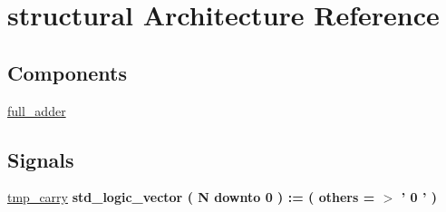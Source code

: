 \hypertarget{classripple__carry__adder_1_1structural}{\section{structural Architecture Reference}
\label{classripple__carry__adder_1_1structural}
}
\subsection*{Components}
 \begin{DoxyCompactItemize}
\item 
\hypertarget{classripple__carry__adder_1_1structural_gafc1dc8c8d5b91fffc35f2b2eede724ce}{\hyperlink{group___majority_voter_gafc1dc8c8d5b91fffc35f2b2eede724ce}{full\+\_\+adder}  {\bfseries }  }\label{classripple__carry__adder_1_1structural_gafc1dc8c8d5b91fffc35f2b2eede724ce}

\end{DoxyCompactItemize}
\subsection*{Signals}
 \begin{DoxyCompactItemize}
\item 
\hypertarget{classripple__carry__adder_1_1structural_ga2943a61ba696a3860c97e0fc3e492416}{\hyperlink{group___majority_voter_ga2943a61ba696a3860c97e0fc3e492416}{tmp\+\_\+carry} {\bfseries \textcolor{vhdlchar}{std\+\_\+logic\+\_\+vector}\textcolor{vhdlchar}{ }\textcolor{vhdlchar}{(}\textcolor{vhdlchar}{ }\textcolor{vhdlchar}{ }\textcolor{vhdlchar}{ }\textcolor{vhdlchar}{ }\textcolor{vhdlchar}{N}\textcolor{vhdlchar}{ }\textcolor{vhdlchar}{downto}\textcolor{vhdlchar}{ }\textcolor{vhdlchar}{ } \textcolor{vhdldigit}{0} \textcolor{vhdlchar}{ }\textcolor{vhdlchar}{)}\textcolor{vhdlchar}{ }\textcolor{vhdlchar}{ }\textcolor{vhdlchar}{ }\textcolor{vhdlchar}{\+:}\textcolor{vhdlchar}{=}\textcolor{vhdlchar}{ }\textcolor{vhdlchar}{(}\textcolor{vhdlchar}{ }\textcolor{vhdlchar}{ }\textcolor{vhdlchar}{others}\textcolor{vhdlchar}{ }\textcolor{vhdlchar}{ }\textcolor{vhdlchar}{=}\textcolor{vhdlchar}{ }\textcolor{vhdlchar}{$>$}\textcolor{vhdlchar}{ }\textcolor{vhdlchar}{'}\textcolor{vhdlchar}{ } \textcolor{vhdldigit}{0} \textcolor{vhdlchar}{ }\textcolor{vhdlchar}{'}\textcolor{vhdlchar}{ }\textcolor{vhdlchar}{)}\textcolor{vhdlchar}{ }} }\label{classripple__carry__adder_1_1structural_ga2943a61ba696a3860c97e0fc3e492416}

\end{DoxyCompactItemize}
